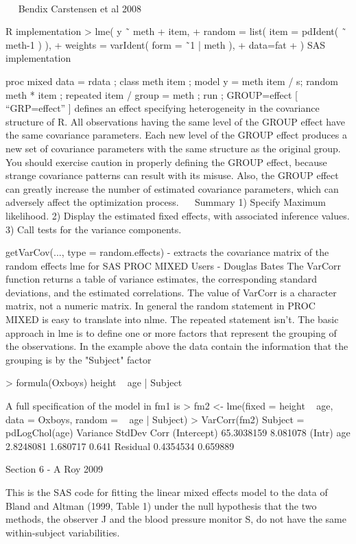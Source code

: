  



 
Bendix Carstensen et al 2008

R implementation
> lme( y ˜ meth + item,
+ random = list( item = pdIdent( ˜ meth-1 ) ),
+ weights = varIdent( form = ˜1 | meth ),
+ data=fat
+ )
SAS implementation

proc mixed data = rdata ;
class meth item ;
model y = meth item / s;
random meth * item ;
repeated item / group = meth ;
run ;
GROUP=effect	[ “GRP=effect” ]
defines an effect specifying heterogeneity in the covariance structure of R. 
All observations having the same level of the GROUP effect have the same covariance parameters. 
Each new level of the GROUP effect produces a new set of covariance parameters with the same structure as the original group. 
You should exercise caution in properly defining the GROUP effect, because strange covariance patterns can result with its misuse. Also, the GROUP effect can greatly increase the number of estimated covariance parameters, which can adversely affect the optimization process. 
 
Summary  
1)	Specify Maximum likelihood.
2)	Display the estimated fixed effects, with associated inference values.
3)	Call tests for the variance components.

getVarCov(..., type = random.effects) - extracts the covariance matrix of the random effects
lme for SAS PROC MIXED Users - Douglas Bates
The VarCorr function returns a table of variance estimates, the
corresponding standard deviations, and the estimated correlations.
The value of VarCorr is a character matrix, not a numeric matrix. 
In general the random statement in PROC MIXED is
easy to translate into nlme.  The repeated statement isn't.
The basic approach in lme is to define one or more factors that represent the grouping of the observations.  In the example above the data contain the information that the grouping is by the "Subject"
factor

 > formula(Oxboys)
 height ~ age | Subject

A full specification of the model in fm1 is
 > fm2 <- lme(fixed = height ~ age, data = Oxboys, random = ~ age | Subject)
 > VarCorr(fm2)
 Subject = pdLogChol(age) 
             Variance   StdDev   Corr  
 (Intercept) 65.3038159 8.081078 (Intr)
 age          2.8248081 1.680717 0.641 
 Residual     0.4354534 0.659889   

\newpage
Section 6  -  A Roy 2009

This is the SAS code for fitting the linear mixed effects model to the data of Bland and Altman (1999, Table 1) under the null hypothesis that the two methods, the observer J and the blood pressure monitor S, do not have the same within-subject variabilities. 

